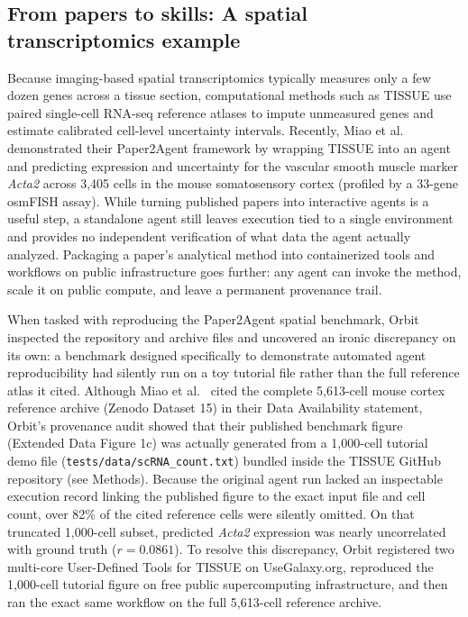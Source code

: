 \documentclass[11pt,letterpaper]{article}
\begin{document}
\subsection{From papers to skills: A spatial transcriptomics example}

Because imaging-based spatial transcriptomics typically measures only a few dozen genes across a tissue section, computational methods such as TISSUE \cite{sun2024} use paired single-cell RNA-seq reference atlases to impute unmeasured genes and estimate calibrated cell-level uncertainty intervals. Recently, Miao et al.\ \cite{miao2026} demonstrated their Paper2Agent framework by wrapping TISSUE into an agent and predicting expression and uncertainty for the vascular smooth muscle marker \textit{Acta2} across 3,405 cells in the mouse somatosensory cortex (profiled by a 33-gene osmFISH assay). While turning published papers into interactive agents is a useful step, a standalone agent still leaves execution tied to a single environment and provides no independent verification of what data the agent actually analyzed. Packaging a paper's analytical method into containerized tools and workflows on public infrastructure goes further: any agent can invoke the method, scale it on public compute, and leave a permanent provenance trail.

When tasked with reproducing the Paper2Agent spatial benchmark, Orbit inspected the repository and archive files and uncovered an ironic discrepancy on its own: a benchmark designed specifically to demonstrate automated agent reproducibility had silently run on a toy tutorial file rather than the full reference atlas it cited. Although Miao et al.\ \cite{miao2026} cited the complete 5,613-cell mouse cortex reference archive (Zenodo Dataset 15) in their Data Availability statement, Orbit's provenance audit showed that their published benchmark figure (Extended Data Figure 1c) was actually generated from a 1,000-cell tutorial demo file (\texttt{tests/data/scRNA\_count.txt}) bundled inside the TISSUE GitHub repository (see Methods). Because the original agent run lacked an inspectable execution record linking the published figure to the exact input file and cell count, over 82\% of the cited reference cells were silently omitted. On that truncated 1,000-cell subset, predicted \textit{Acta2} expression was nearly uncorrelated with ground truth ($r = 0.0861$). To resolve this discrepancy, Orbit registered two multi-core User-Defined Tools for TISSUE on UseGalaxy.org, reproduced the 1,000-cell tutorial figure on free public supercomputing infrastructure, and then ran the exact same workflow on the full 5,613-cell reference archive.
\end{document}

